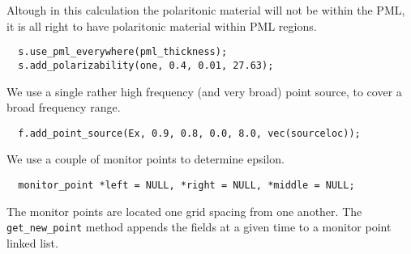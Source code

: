 \begin{comment}
const double a = 10;
const double pml_thickness = 1.0;
const double middlesize = 1.0;
const double zsize = middlesize + 2*pml_thickness;
\end{verbatim}

For our example polaritonic material, we'll use an $\epsilon(0)$ of 13.4. %

\begin{verbatim}
double eps(const vec &) { return 13.4; }
\end{verbatim}
\begin{comment}
double one(const vec &p) {
  return 1;
}

int main(int argc, char **argv) {
  initialize mpi(argc, argv);
  deal_with_ctrl_c();
  const double ttot =2000.0;
  const volume v = volone(zsize, a);
  const symmetry S = mirror(Z, v);
  structure s(v, eps, 0, S);
  const char *dirname = make_output_directory(__FILE__);
  s.set_output_directory(dirname);
\end{comment}
Altough in this calculation the polaritonic material will not be within the
PML, it is all right to have polaritonic material within PML regions.
\begin{verbatim}
  s.use_pml_everywhere(pml_thickness);
  s.add_polarizability(one, 0.4, 0.01, 27.63);
\end{verbatim}
\begin{comment}
  fields f(&s);
  double sourceloc = pml_thickness+1.0/(double)a;
\end{comment}
We use a single rather high frequency (and very broad) point source, to
cover a broad frequency range.
\begin{verbatim}
  f.add_point_source(Ex, 0.9, 0.8, 0.0, 8.0, vec(sourceloc));
\end{verbatim}
We use a couple of monitor points to determine epsilon.
\begin{verbatim}
  monitor_point *left = NULL, *right = NULL, *middle = NULL;
\end{verbatim}
\begin{comment}
  double next_printtime = 100;
  while (f.time() <= ttot && !interrupt) {
    if (f.time() >= next_printtime) {
      next_printtime += 100;
      master_printf("Working on time %
      master_printf("energy is %
    }
\end{comment}
The monitor points are located one grid spacing from one another.  The
\verb*|get_new_point| method appends the fields at a given time to a
monitor point linked list.
